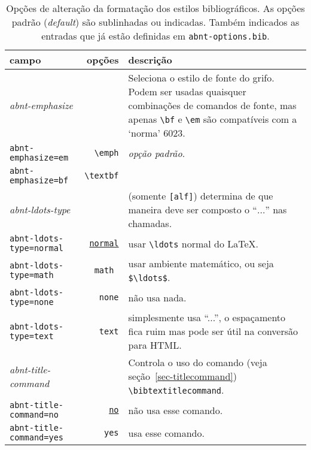 \documentclass[espacosimples]{abnt}
\begin{document}
\begin{table}[htbp]
\begin{center}
\begin{tabular}{lrp{8cm}}\hline\hline
campo & opções & descrição \\ \hline
\emph{abnt-emphasize} & & Seleciona o estilo de fonte do grifo.
Podem ser usadas quaisquer combinações de comandos de fonte, mas apenas
\verb+\bf+ e \verb+\em+ são compatíveis com a `norma' 6023. \\
{\tt abnt-emphasize=em} & \verb+\emph+ & {\em opção padrão}.  \\
{\tt abnt-emphasize=bf} & \verb+\textbf+ &
\\ \hline
\emph{abnt-ldots-type} && (somente {\tt [alf]}) determina de que maneira deve
ser composto o ``$\ldots$'' nas chamadas. \\
{\tt abnt-ldots-type=normal} & \underline{\tt normal} & usar \verb+\ldots+ normal do \LaTeX.\\
{\tt abnt-ldots-type=math} & \tt math & usar ambiente matemático, ou seja
\verb+$\ldots$+.\\
{\tt abnt-ldots-type=none} & {\tt none} & não usa nada.\\
{\tt abnt-ldots-type=text} & {\tt text} & simplesmente usa ``...'', o espaçamento
fica ruim mas pode ser útil na conversão para HTML.
\\ \hline
\emph{abnt-title-command} && Controla o uso do comando (veja
seção~\ref{sec-titlecommand}) \verb+\bibtextitlecommand+. \\
{\tt abnt-title-command=no} & \underline{\tt no} & não usa esse comando.\\
{\tt abnt-title-command=yes} & {\tt yes} & usa esse comando.
\\ \hline\hline
\end{tabular}
\end{center}
\caption[Opções de alteração dos estilos bibliográficos: formatação]{
Opções de alteração da formatação dos estilos bibliográficos.
As opções padrão (\emph{default}) são sublinhadas ou indicadas.
Também indicados as entradas que já estão definidas em {\tt abnt-options.bib}.}
\label{tabela-opcoes-formatacao}
\end{table}
\end{document}

